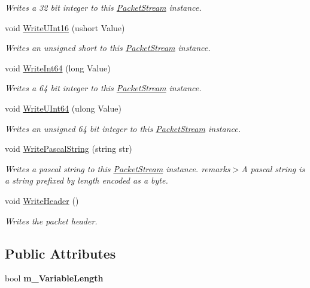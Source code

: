 \begin{DoxyCompactItemize}
\begin{DoxyCompactList}\small\item\em Writes a 32 bit integer to this \hyperlink{class_gonzo_net_1_1_packet_stream}{Packet\+Stream} instance. \end{DoxyCompactList}\item 
void \hyperlink{class_gonzo_net_1_1_packet_stream_afae64dd42131f8641173d14a6820a05d}{Write\+U\+Int16} (ushort Value)
\begin{DoxyCompactList}\small\item\em Writes an unsigned short to this \hyperlink{class_gonzo_net_1_1_packet_stream}{Packet\+Stream} instance. \end{DoxyCompactList}\item 
void \hyperlink{class_gonzo_net_1_1_packet_stream_a7f877947780ba47aaf5ea7bfcd798943}{Write\+Int64} (long Value)
\begin{DoxyCompactList}\small\item\em Writes a 64 bit integer to this \hyperlink{class_gonzo_net_1_1_packet_stream}{Packet\+Stream} instance. \end{DoxyCompactList}\item 
void \hyperlink{class_gonzo_net_1_1_packet_stream_a7ea296bcbea1c050416cace7122f4519}{Write\+U\+Int64} (ulong Value)
\begin{DoxyCompactList}\small\item\em Writes an unsigned 64 bit integer to this \hyperlink{class_gonzo_net_1_1_packet_stream}{Packet\+Stream} instance. \end{DoxyCompactList}\item 
void \hyperlink{class_gonzo_net_1_1_packet_stream_a12cf6a218ef7fab90471707fb339ce59}{Write\+Pascal\+String} (string str)
\begin{DoxyCompactList}\small\item\em Writes a pascal string to this \hyperlink{class_gonzo_net_1_1_packet_stream}{Packet\+Stream} instance. remarks$>$A pascal string is a string prefixed by length encoded as a byte.\end{DoxyCompactList}\item 
void \hyperlink{class_gonzo_net_1_1_packet_stream_a19779aa4830b78c759547e6a2a6819df}{Write\+Header} ()
\begin{DoxyCompactList}\small\item\em Writes the packet header. \end{DoxyCompactList}\end{DoxyCompactItemize}
\subsection*{Public Attributes}
\begin{DoxyCompactItemize}
\item 
\hypertarget{class_gonzo_net_1_1_packet_stream_a4b09bc82bc4349f1ca554b0b75e673cd}{bool {\bfseries m\+\_\+\+Variable\+Length}}\label{class_gonzo_net_1_1_packet_stream_a4b09bc82bc4349f1ca554b0b75e673cd}

\end{DoxyCompactItemize}
